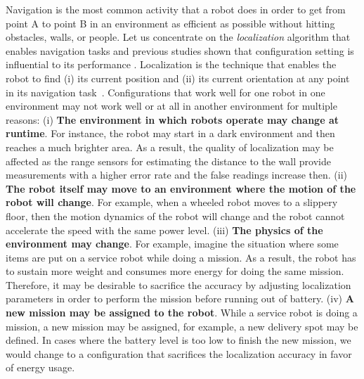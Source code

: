 Navigation is the most common activity that a robot does in order to get from point A to point B in an environment as efficient as possible without hitting obstacles, walls, or people. Let us concentrate on the \emph{localization} algorithm that enables navigation tasks and previous studies shown that configuration setting is influential to its performance \cite{kawthekarsensitivity}. Localization is the technique that enables the robot to find (i) its current position and (ii) its current orientation at any point in its navigation task~\cite{thrun2005probabilistic}.
Configurations that work well for one robot in one environment may not work well or at all in another environment for multiple reasons: %
(i) \textbf{The environment in which robots operate may change at runtime}. For instance, the robot may start in a dark environment and then reaches a much brighter area. As a result, the quality of localization may be affected as the range sensors for estimating the distance to the wall provide measurements with a higher error rate and the false readings increase then. %
(ii) \textbf{The robot itself may move to an environment where the motion of the robot will change}. For example, when a wheeled robot moves to a slippery floor, then the motion dynamics of the robot will change and the robot cannot accelerate the speed with the same power level.
(iii) \textbf{The physics of the environment may change}. For example, imagine the situation where some items are put on a service robot while doing a mission. As a result, the robot has to sustain more weight and consumes more energy for doing the same mission. Therefore, it may be desirable to sacrifice the accuracy by adjusting localization parameters in order to perform the mission before running out of battery.
(iv) \textbf{A new mission may be assigned to the robot}. While a service robot is doing a mission, a new mission may be assigned, for example, a new delivery spot may be defined. In cases where the battery level is too low to finish the new mission, we would change to a configuration that sacrifices the localization accuracy in favor of energy usage.

